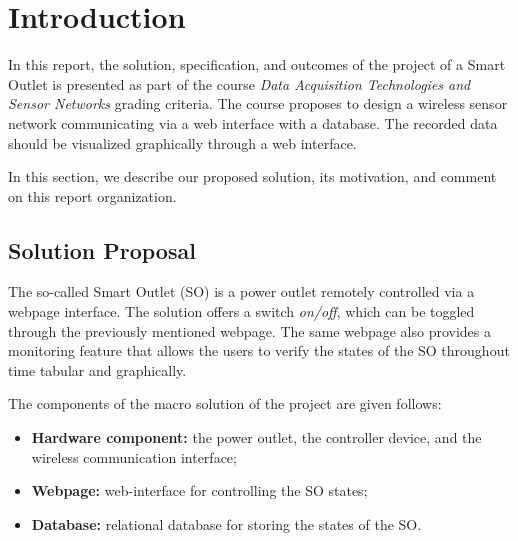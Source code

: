 %
%
%
%


\section{Introduction}

In this report, the solution, specification, and outcomes of the project of a
Smart Outlet is presented as part of the course \textit{Data Acquisition
Technologies and Sensor Networks} grading criteria. The course proposes to
design a wireless sensor network communicating via a web interface with a
database. The recorded data should be visualized graphically through a
web interface.

In this section, we describe our proposed solution, its motivation, and comment
on this report organization.

\subsection{Solution Proposal}

The so-called Smart Outlet (SO) is a power outlet remotely controlled via a webpage
interface. The solution offers a switch \textit{on/off}, which can be toggled
through the previously mentioned webpage. The same webpage also provides a
monitoring feature that allows the users to verify the states of the SO
throughout time tabular and graphically.

The components of the macro solution of the project are given follows:

\begin{itemize}
    \item \textbf{Hardware component:} the power outlet, the controller device,
    and the wireless communication interface;
    \item \textbf{Webpage:} web-interface for controlling the SO states;
    \item \textbf{Database:} relational database for storing the states of the SO.
\end{itemize}

